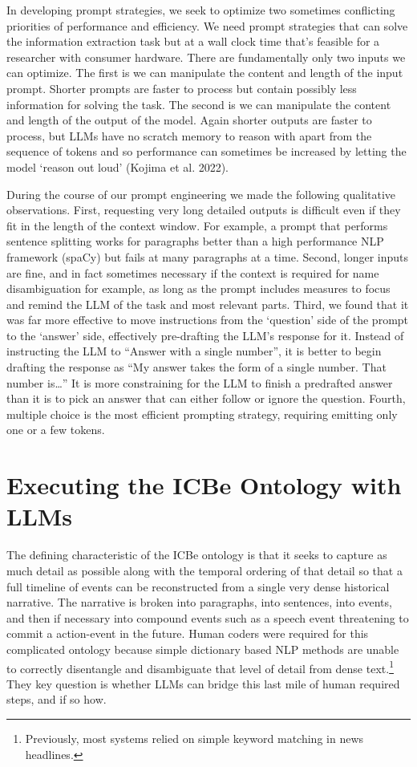 \documentclass[
]{article}
\begin{document}
In developing prompt strategies, we seek to optimize two sometimes
conflicting priorities of performance and efficiency. We need prompt
strategies that can solve the information extraction task but at a wall
clock time that's feasible for a researcher with consumer hardware.
There are fundamentally only two inputs we can optimize. The first is we
can manipulate the content and length of the input prompt. Shorter
prompts are faster to process but contain possibly less information for
solving the task. The second is we can manipulate the content and length
of the output of the model. Again shorter outputs are faster to process,
but LLMs have no scratch memory to reason with apart from the sequence
of tokens and so performance can sometimes be increased by letting the
model `reason out loud' (Kojima et al. 2022).

During the course of our prompt engineering we made the following
qualitative observations. First, requesting very long detailed outputs
is difficult even if they fit in the length of the context window. For
example, a prompt that performs sentence splitting works for paragraphs
better than a high performance NLP framework (spaCy) but fails at many
paragraphs at a time. Second, longer inputs are fine, and in fact
sometimes necessary if the context is required for name disambiguation
for example, as long as the prompt includes measures to focus and remind
the LLM of the task and most relevant parts. Third, we found that it was
far more effective to move instructions from the `question' side of the
prompt to the `answer' side, effectively pre-drafting the LLM's response
for it. Instead of instructing the LLM to ``Answer with a single
number'', it is better to begin drafting the response as ``My answer
takes the form of a single number. That number is\ldots{}'' It is more
constraining for the LLM to finish a predrafted answer than it is to
pick an answer that can either follow or ignore the question. Fourth,
multiple choice is the most efficient prompting strategy, requiring
emitting only one or a few tokens.

\section{Executing the ICBe Ontology with
LLMs}\label{executing-the-icbe-ontology-with-llms}

The defining characteristic of the ICBe ontology is that it seeks to
capture as much detail as possible along with the temporal ordering of
that detail so that a full timeline of events can be reconstructed from
a single very dense historical narrative. The narrative is broken into
paragraphs, into sentences, into events, and then if necessary into
compound events such as a speech event threatening to commit a
action-event in the future. Human coders were required for this
complicated ontology because simple dictionary based NLP methods are
unable to correctly disentangle and disambiguate that level of detail
from dense text.\footnote{Previously, most systems relied on simple
  keyword matching in news headlines.} They key question is whether LLMs
can bridge this last mile of human required steps, and if so how.
\end{document}
